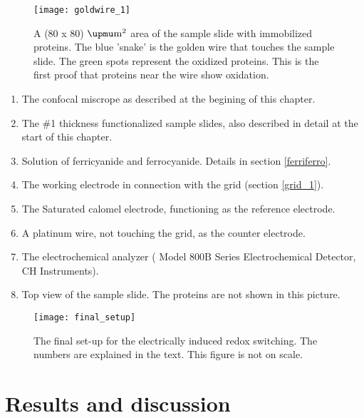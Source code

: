 \documentclass[twoside,single]{lion-msc}
\begin{document}
\begin{figure}[ht!]
\centering
\texttt{[image: goldwire\_1]}
\caption{A (80 x 80) $\upmu \textup{m}^{2}$ area of the sample slide with immobilized proteins. The blue 'snake' is the golden wire that touches the sample slide. The green spots represent the oxidized proteins. This is the first proof that proteins near the wire show oxidation.}
\label{goldenwire_1}
\end{figure}



\begin{enumerate}
\item The confocal miscrope as described at the begining of this chapter.
\item The\diameter 25mm \#1 thickness functionalized sample slides, also described in detail at the start of this chapter.
\item Solution of ferricyanide and ferrocyanide. Details in section \ref{ferriferro}.
\item The working electrode in connection with the grid (section \ref{grid_1}).
\item The Saturated calomel electrode, functioning as the reference electrode.
\item A platinum wire, not touching the grid, as the counter electrode.
\item The electrochemical analyzer ( Model 800B Series Electrochemical Detector, CH Instruments).
\item Top view of the sample slide. The proteins are not shown in this picture.

\end{enumerate}


\begin{figure}[ht!]
\centering
\texttt{[image: final\_setup]}
\caption{The final set-up for the electrically induced redox switching. The numbers are explained in the text. This figure is not on scale.}
\label{final_setup}
\end{figure}



\chapter{Results and discussion}
\end{document}
